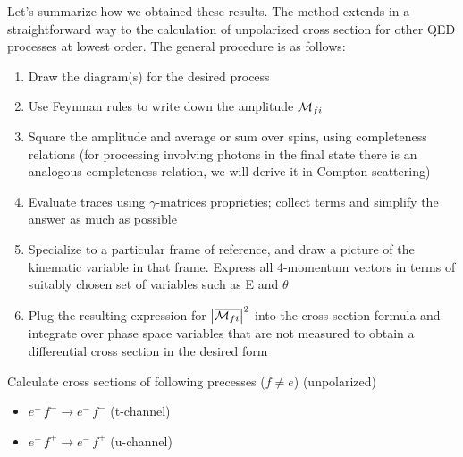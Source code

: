 \documentclass[TheoreticalPhy_ModB.tex]{subfiles}
\begin{document}
\skipline
Let's summarize how we obtained these results. The method extends in a straightforward way to the calculation of unpolarized cross section for other QED processes at lowest order. The general procedure is as follows:
\begin{enumerate}[label=(\arabic*)]
\item Draw the diagram(s) for the desired process
\item Use Feynman rules to write down the amplitude $\mathcal{M}_{fi}$
\item Square the amplitude and average or sum over spins, using completeness relations (for processing involving photons in the final state there is an analogous completeness relation, we will derive it in Compton scattering)
\item Evaluate traces using $\gamma$-matrices proprieties; collect terms and simplify the answer as much as possible
\item Specialize to a particular frame of reference, and draw a picture of the kinematic variable in that frame. Express all 4-momentum vectors in terms of suitably chosen set of variables such as E and $\theta$
\item Plug the resulting expression for $\abs{\overline{\mathcal{M}_{fi}}}^2$ into the cross-section formula and integrate over phase space variables that are not measured to obtain a differential cross section in the desired form
\end{enumerate}

\begin{exercise}
Calculate cross sections of following precesses ($f \ne e$) (unpolarized)
\begin{itemize}[label = $\bullet$]
\item $e^- \, f^- \to e^- \, f^-$ \quad (t-channel)
\item $e^- \, f^+ \to e^- \, f^+$ \quad (u-channel) 
\end{itemize}
\end{exercise}
\end{document}
